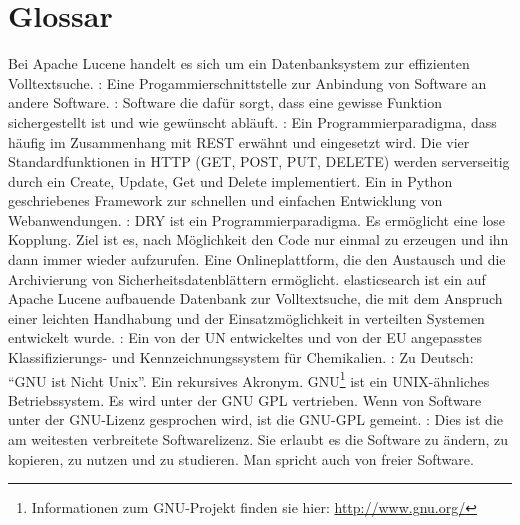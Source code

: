 \chapter{Glossar}
 \label{sec:Glossar_glo}

\begin{acronym}[Django-Framework]%
  Bei Apache Lucene handelt es sich um ein
 Datenbanksystem zur effizienten Volltextsuche.
: Eine Progammierschnittstelle
 zur Anbindung von Software an andere Software.
 : Software die dafür sorgt, dass eine gewisse Funktion
 sichergestellt ist und wie gewünscht abläuft.
 : Ein Programmierparadigma, dass häufig
 im Zusammenhang mit \ac{REST} erwähnt und eingesetzt wird. Die vier
 Standardfunktionen in \ac{HTTP} (GET, POST, PUT, DELETE) werden serverseitig
 durch ein Create, Update, Get und Delete implementiert.
  Ein in Python geschriebenes Framework zur schnellen
 und einfachen Entwicklung von Webanwendungen.
 : DRY ist ein Programmierparadigma.
 Es ermöglicht eine lose Kopplung. Ziel ist es, nach Möglichkeit den Code nur
 einmal zu erzeugen und ihn dann immer wieder aufzurufen.
  Eine Onlineplattform, die den Austausch und die Archivierung von
 Sicherheitsdatenblättern ermöglicht.
  elasticsearch ist ein auf Apache Lucene aufbauende
 Datenbank zur Volltextsuche, die mit dem Anspruch einer leichten
 Handhabung und der Einsatzmöglichkeit in verteilten Systemen
 entwickelt wurde.
 : Ein von der UN entwickeltes und von der EU angepasstes
 Klassifizierungs- und Kennzeichnungssystem für Chemikalien.
 : Zu Deutsch: "`GNU ist Nicht Unix"'. Ein rekursives
 Akronym. GNU\footnote{Informationen zum GNU-Projekt finden sie
 hier: \url{http://www.gnu.org/}} ist ein UNIX-ähnliches Betriebssystem.
 Es wird unter der GNU \ac{GPL} vertrieben. Wenn von Software unter der GNU-Lizenz gesprochen wird,
 ist die GNU-\ac{GPL} gemeint.
 : Dies ist die am weitesten verbreitete
 Softwarelizenz. Sie erlaubt es die Software zu ändern, zu kopieren, zu nutzen
 und zu studieren. Man spricht auch von freier Software.

\end{acronym}
